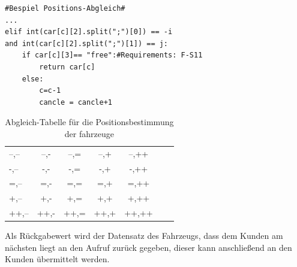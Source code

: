 \begin{lstlisting}
#Bespiel Positions-Abgleich#
...
elif int(car[c][2].split(";")[0]) == -i
and int(car[c][2].split(";")[1]) == j:
	if car[c][3]== "free":#Requirements: F-S11
    	return car[c]
    else:
        c=c-1
       	cancle = cancle+1
\end{lstlisting}
\begin{table}[h]
\centering
\label{tab.1}
\caption{Abgleich-Tabelle für die Positionsbestimmung der fahrzeuge}
\begin{tabular}{lcccccr}
--,--&--,-&--,=&--,+&--,++\\
-,--&-,-&-,=&-,+&-,++\\
=,--&=,-&=,=&=,+&=,++\\
+,--&+,-&+,=&+,+&+,++\\
++,--&++,-&++,=&++,+&++,++\\
\end{tabular}
\end{table}
Als Rückgabewert wird der Datensatz des Fahrzeugs, dass dem Kunden am nächsten liegt an den Aufruf zurück gegeben, dieser kann anschließend an den Kunden übermittelt werden.
